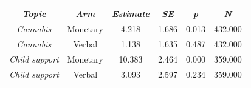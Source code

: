 \begin{tabular}{c c c c c c}
      \hline
      \textit{Topic} & \textit{Arm} & \textit{Estimate} & \textit{SE} & \textit{p} & \textit{N} \\
      \hline
      \textit{Cannabis} & Monetary & 4.218 & 1.686 & 0.013 & 432.000 \\
      \textit{Cannabis} & Verbal & 1.138 & 1.635 & 0.487 & 432.000 \\
      \textit{Child support} & Monetary & 10.383 & 2.464 & 0.000 & 359.000 \\
      \textit{Child support} & Verbal & 3.093 & 2.597 & 0.234 & 359.000 \\
      \hline
    \end{tabular}